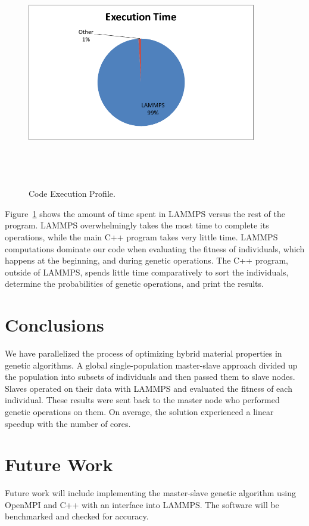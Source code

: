 \documentclass[letterpaper, 12pt]{article}
\begin{document}
\begin{flushleft}
~\newline
\begin{figure}[H]
	\centering
	\includegraphics[width=10cm,height=10cm,keepaspectratio]{execution.png}
	\caption[Execution]{Code Execution Profile.}
	\label{fig:execprofile}
\end{figure}

Figure~\ref{fig:execprofile} shows the amount of time spent in LAMMPS versus the rest of the program.  LAMMPS overwhelmingly takes the most time to complete its operations, while the main C++ program takes very little time.  LAMMPS computations dominate our code when evaluating the fitness of individuals, which happens at the beginning, and during genetic operations.  The C++ program, outside of LAMMPS, spends little time comparatively to sort the individuals, determine the probabilities of genetic operations, and print the results. \\

\newpage
\section*{Conclusions}
We have parallelized the process of optimizing hybrid material properties in genetic algorithms.  A global single-population master-slave approach  divided up the population into subsets of individuals and then passed them to slave nodes.  Slaves operated on their data with LAMMPS and evaluated the fitness of each individual.  These results were sent back to the master node who performed genetic operations on them.  On average, the solution experienced a linear speedup with the number of cores.

\section*{Future Work}
Future work will include implementing the master-slave genetic algorithm using OpenMPI and C++ with an interface into LAMMPS.  The software will be benchmarked and checked for accuracy.
\newpage
\printbibliography

\end{flushleft}
\end{document}
